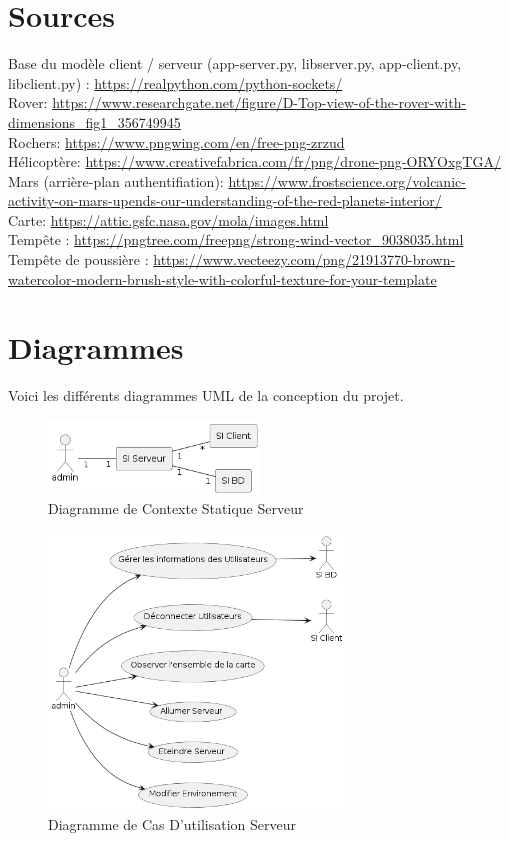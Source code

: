 \documentclass[12pt,a4paper]{scrartcl}
\begin{document}
\section{Sources} \label{sources}
Base du modèle client / serveur (app-server.py, libserver.py, app-client.py, libclient.py) : \url{https://realpython.com/python-sockets/}\\
Rover: \url{https://www.researchgate.net/figure/D-Top-view-of-the-rover-with-dimensions_fig1_356749945}\\
Rochers: \url{https://www.pngwing.com/en/free-png-zrzud}\\
Hélicoptère: \url{https://www.creativefabrica.com/fr/png/drone-png-ORYOxgTGA/}\\
Mars (arrière-plan authentifiation): \url{https://www.frostscience.org/volcanic-activity-on-mars-upends-our-understanding-of-the-red-planets-interior/}\\
Carte: \url{https://attic.gsfc.nasa.gov/mola/images.html}\\
Tempête : \url{https://pngtree.com/freepng/strong-wind-vector_9038035.html}\\
Tempête de poussière : \url{https://www.vecteezy.com/png/21913770-brown-watercolor-modern-brush-style-with-colorful-texture-for-your-template}\\

\section{Diagrammes} \label{diagrammes}
Voici les différents diagrammes UML de la conception du projet.
\begin{figure}[b]
    \centering
    \includegraphics[width=0.5\textwidth]{DiagCS_Admin.png}
    \caption{Diagramme de Contexte Statique Serveur}\label{cs_serv}
\end{figure}

\begin{figure}
    \centering
    \includegraphics[width=0.7\textwidth]{Diag_UC_Admin.png}
    \caption{Diagramme de Cas D'utilisation Serveur}\label{uc_serv}
\end{figure}
\end{document}
